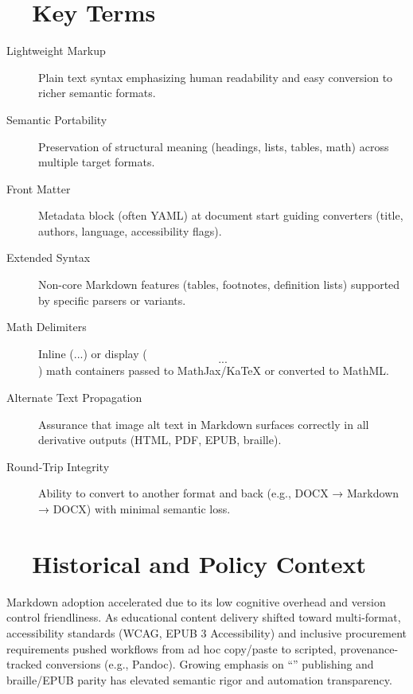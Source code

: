 \section{~~Key Terms}\label{ch19:sec:key-terms}
\begin{description}
	\item[Lightweight Markup] Plain text syntax emphasizing human readability and easy conversion to richer semantic formats.
	\item[Semantic Portability] Preservation of structural meaning (headings, lists, tables, math) across multiple target formats.
	\item[Front Matter] Metadata block (often YAML) at document start guiding converters (title, authors, language, accessibility flags).
	\item[Extended Syntax] Non-core Markdown features (tables, footnotes, definition lists) supported by specific parsers or variants.
	\item[Math Delimiters] Inline ($...$) or display ($$...$$) math containers passed to MathJax/KaTeX or converted to MathML.
	\item[Alternate Text Propagation] Assurance that image alt text in Markdown surfaces correctly in all derivative outputs (HTML, PDF, EPUB, braille).
	\item[Round-Trip Integrity] Ability to convert to another format and back (e.g., DOCX → Markdown → DOCX) with minimal semantic loss.
\end{description}

\section{~~Historical and Policy Context}\label{ch19:sec:historical-policy}
Markdown adoption accelerated due to its low cognitive overhead and version control friendliness. As educational content delivery shifted toward multi-format, accessibility standards (WCAG, EPUB 3 Accessibility) and inclusive procurement requirements pushed workflows from ad hoc copy/paste to scripted, provenance-tracked conversions (e.g., Pandoc\supercite{Pandoc}). Growing emphasis on “” publishing and braille/EPUB parity has elevated semantic rigor and automation transparency.

